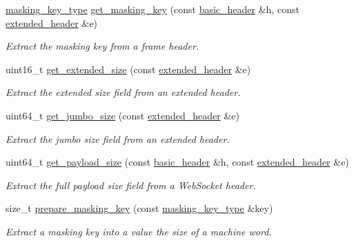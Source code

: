 \begin{DoxyCompactItemize}
\item 
\hyperlink{unionwebsocketpp_1_1frame_1_1uint32__converter}{masking\+\_\+key\+\_\+type} \hyperlink{namespacewebsocketpp_1_1frame_aed7edd146ce3aa5b87adc9fcc5fcb10f}{get\+\_\+masking\+\_\+key} (const \hyperlink{structwebsocketpp_1_1frame_1_1basic__header}{basic\+\_\+header} \&h, const \hyperlink{structwebsocketpp_1_1frame_1_1extended__header}{extended\+\_\+header} \&e)
\begin{DoxyCompactList}\small\item\em Extract the masking key from a frame header. \end{DoxyCompactList}\item 
uint16\+\_\+t \hyperlink{namespacewebsocketpp_1_1frame_a5ae0cc87ac44bb78c5dc41983c43a0c4}{get\+\_\+extended\+\_\+size} (const \hyperlink{structwebsocketpp_1_1frame_1_1extended__header}{extended\+\_\+header} \&e)
\begin{DoxyCompactList}\small\item\em Extract the extended size field from an extended header. \end{DoxyCompactList}\item 
uint64\+\_\+t \hyperlink{namespacewebsocketpp_1_1frame_ac55b672bcd3baf4c5a074816f6eb035b}{get\+\_\+jumbo\+\_\+size} (const \hyperlink{structwebsocketpp_1_1frame_1_1extended__header}{extended\+\_\+header} \&e)
\begin{DoxyCompactList}\small\item\em Extract the jumbo size field from an extended header. \end{DoxyCompactList}\item 
uint64\+\_\+t \hyperlink{namespacewebsocketpp_1_1frame_a2ca0b9ba6077f201997da543d45b067f}{get\+\_\+payload\+\_\+size} (const \hyperlink{structwebsocketpp_1_1frame_1_1basic__header}{basic\+\_\+header} \&h, const \hyperlink{structwebsocketpp_1_1frame_1_1extended__header}{extended\+\_\+header} \&e)
\begin{DoxyCompactList}\small\item\em Extract the full payload size field from a Web\+Socket header. \end{DoxyCompactList}\item 
size\+\_\+t \hyperlink{namespacewebsocketpp_1_1frame_af80eee705eb39fb533cf4ab3d7a6d3bb}{prepare\+\_\+masking\+\_\+key} (const \hyperlink{unionwebsocketpp_1_1frame_1_1uint32__converter}{masking\+\_\+key\+\_\+type} \&key)
\begin{DoxyCompactList}\small\item\em Extract a masking key into a value the size of a machine word. \end{DoxyCompactList}\item 

\end{DoxyCompactItemize}
